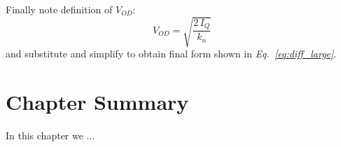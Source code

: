 Finally note definition of $V_{OD}$:
    \begin{equation}
        V_{OD} = \sqrt{\frac{2\,I_Q}{k_n}}
    \end{equation}
and substitute and simplify to obtain final form shown in \emph{Eq.~\ref{eq:diff_large}}.
\newpage
\section{Chapter Summary}
In this chapter we ...
